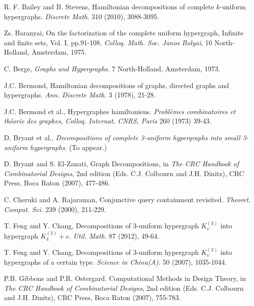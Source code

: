 
\begin{thebibliography}{99}

  R. F. Bailey and B. Stevens,
  Hamiltonian decompositions of complete $k$-uniform hypergraphs.
  {\em Discrete Math}. 310 (2010), 3088-3095.

  Zs. Baranyai,
  On the factorization of the complete uniform hypergraph, Infinite and finite
  sets, Vol. I, pp.91-108.
  {\em Colloq. Math. Soc. Janos Bolyai}, 10 North-Holland, Amsterdam, 1975.

  C. Berge,
  {\em Graphs and Hypergraphs}.
  7 North-Holland, Amsterdam, 1973.

  J.C. Bermond,
  Hamiltonian decompositions of graphs, directed graphs and
  hypergraphs.
  {\em Ann. Discrete Math.} 3 (1978), 21-28.

  J.C. Bermond et al.,
  Hypergraphes hamiltoniens.
  {\em Probl\`{e}mes combinatoires et th\'{e}orie des graphes, Colloq.
  Internat. CNRS, Paris} 260 (1973) 39-43.

  D. Bryant et al.,
  {\em Decompositions of complete 3-uniform hypergraphs into small 3-uniform
  hypergraphs}.
  (To appear.) %

  D. Bryant and S. El-Zanati,
  Graph Decompositions,
  in {\em The CRC Handbook of Combinatorial Designs}, 2nd edition
  (Eds. C.J. Colbourn and J.H. Dinitz),
  CRC Press, Boca Raton (2007), 477-486.

  C. Cheruki and A. Rajaraman,
  Conjunctive query containment revisited.
  {\em Theoret. Comput. Sci.} 239 (2000), 211-229.
  

  T. Feng and Y. Chang,
  Decompositions of 3-uniform hypergraph $K_v^{(3)}$ into hypergraph $K_4^{(3)}
  + e$.
  {\em Util. Math.} 87 (2012), 49-64.

  T. Feng and Y. Chang,
  Decompositions of 3-uniform hypergraph $K_v^{(3)}$ into hypergraphs of a
  certain type.
  {\em Science in China(A)}. 50 (2007), 1035-1044.

  P.B. Gibbons and P.R. Ostergard.
  Computational Methods in Design Theory,
  in {\em The CRC Handbook of Combinatorial Designs}, 2nd edition
  (Eds. C.J. Colbourn and J.H. Dinitz),
  CRC Press, Boca Raton (2007), 755-783.


\end{thebibliography}
